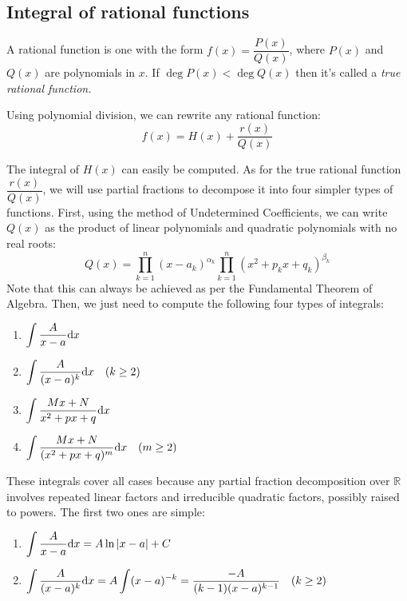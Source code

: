 \documentclass[12pt]{article}
\begin{document}
    \subsection{Integral of rational functions}
    \par A rational function is one with the form $f(x) = \dfrac{P(x)}{Q(x)}$, where $P(x)$ and $Q(x)$ are polynomials in $x$. If $\deg P(x) < \deg Q(x)$ then it's called a \emph{true rational function.}
    \par Using polynomial division, we can rewrite any rational function:
    \begin{equation*}
        f(x) = H(x) + \dfrac{r(x)}{Q(x)}
    \end{equation*}
    \par The integral of $H(x)$ can easily be computed. As for the true rational function $\dfrac{r(x)}{Q(x)}$, we will use partial fractions to decompose it into four simpler types of functions. First, using the method of Undetermined Coefficients, we can write $Q(x)$ as the product of linear polynomials and quadratic polynomials with no real roots:
    \begin{equation*}
        Q(x) = \prod_{k = 1}^{n}(x-a_k)^{\alpha_k} \prod_{k=1}^{n}(x^2+p_kx + q_k)^{\beta_k}
    \end{equation*}
    Note that this can always be achieved as per the Fundamental Theorem of Algebra. Then, we just need to compute the following four types of integrals:
    \begin{insight}
        \begin{enumerate}
            \item $\mathlarger{\int \dfrac{A}{x-a} \dd x}$
            \item $\mathlarger{\int \dfrac{A}{(x-a)^k} \dd x} \quad (k \geq 2)$
            \item $\mathlarger{\int \dfrac{Mx+N}{x^2 + px + q}\dd x}$
            \item $\mathlarger{\int \dfrac{Mx+N}{(x^2 + px + q)^m}\dd x \quad (m \geq 2)}$
        \end{enumerate}
    \end{insight}
    \par These integrals cover all cases because any partial fraction decomposition over $\mathbb{R}$ involves repeated linear factors and irreducible quadratic factors, possibly raised to powers. The first two ones are simple:
    \begin{enumerate}
        \item $\mathlarger{\int \dfrac{A}{x-a}\dd x = A\ln|x-a| + C}$
        \item $\mathlarger{\int \dfrac{A}{(x-a)^k}\dd x = A\int (x-a)^{-k} = \dfrac{-A}{(k-1)(x-a)^{k-1}} \quad (k \geq 2)}$
    \end{enumerate}
\end{document}
